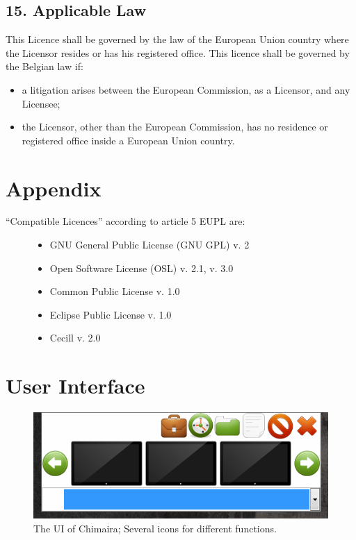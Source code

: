 \documentclass[letterpaper,10pt,english]{sphinxmanual}
\begin{document}
\section{15. Applicable Law}
\label{license:applicable-law}
This Licence shall be governed by the law of the European Union country where the
Licensor resides or has his registered office.
This licence shall be governed by the Belgian law if:
\begin{itemize}
\item {} 
a litigation arises between the European Commission, as a Licensor, and any Licensee;

\item {} 
the Licensor, other than the European Commission, has no residence or registered office inside a European Union country.

\end{itemize}


\chapter{Appendix}
\label{license:appendix}\begin{description}
\item[{“Compatible Licences” according to article 5 EUPL are:}] \leavevmode\begin{itemize}
\item {} 
GNU General Public License (GNU GPL) v. 2

\item {} 
Open Software License (OSL) v. 2.1, v. 3.0

\item {} 
Common Public License v. 1.0

\item {} 
Eclipse Public License v. 1.0

\item {} 
Cecill v. 2.0

\end{itemize}

\end{description}


\chapter{User Interface}
\label{ui::doc}\label{ui:user-interface}\begin{figure}[htbp]
\centering
\capstart

\includegraphics{screencap.png}
\caption{The UI of Chimaira; Several icons for different functions.}\end{figure}
\end{document}
